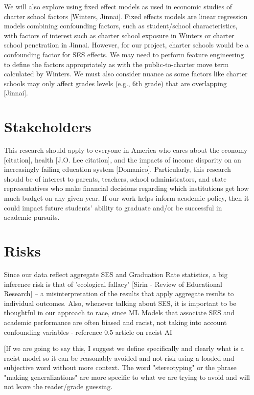\documentclass[sigconf,nonacm,11pt]{acmart}
\begin{document}
We will also explore using fixed effect models as used in economic studies of charter school factors [Winters, Jinnai]. Fixed effects models are linear regression models combining confounding factors, such as student/school characteristics, with factors of interest such as charter school exposure in Winters or charter school penetration in Jinnai. However, for our project, charter schools would be a confounding factor for SES effects. We may need to perform feature engineering to define the factors appropriately as with the public-to-charter move term calculated by Winters. We must also consider nuance as some factors like charter schools may only affect grades levels (e.g., 6th grade) that are overlapping [Jinnai].

\section{Stakeholders}
This research should apply to everyone in America who cares about the economy [citation], health [J.O. Lee citation], and the impacts of income disparity on an increasingly failing education system [Domanico].  Particularly, this research should be of interest to parents, teachers, school administrators, and state representatives who make financial decisions regarding which institutions get how much budget on any given year. If our work helps inform academic policy, then it could impact future students' ability to graduate and/or be successful in academic pursuits.

\section{Risks}
Since our data reflect aggregate SES and Graduation Rate statistics, a big inference risk is that of 'ecological fallacy' [Sirin - Review of Educational Research] -- a misinterpretation of the results that apply aggregate results to individual outcomes.  Also, whenever talking about SES, it is important to be thoughtful in our approach to race, since 
ML Models that associate SES and academic performance are often biased and racist, not taking into account confounding variables - reference 0.5 article on racist AI 

[If we are going to say this, I suggest we define specifically and clearly what is a racist model so it can be reasonably avoided and not risk using a loaded and subjective word without more context. The word "stereotyping" or the phrase "making generalizations" are more specific to what we are trying to avoid and will not leave the reader/grade guessing.
\end{document}

